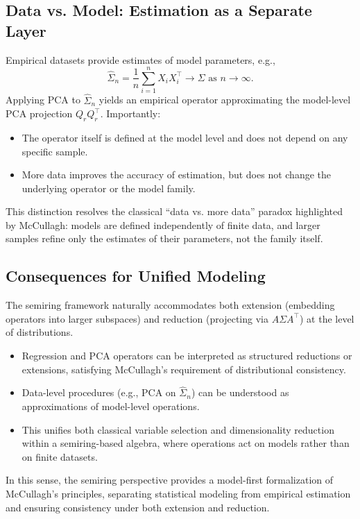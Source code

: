 \subsection{Data vs. Model: Estimation as a Separate Layer}

Empirical datasets provide estimates of model parameters, e.g.,
\[
\hat\Sigma_n = \frac{1}{n} \sum_{i=1}^n X_i X_i^\top \to \Sigma \text{ as } n \to \infty.
\]
Applying PCA to $\hat\Sigma_n$ yields an empirical operator approximating the model-level PCA projection $Q_r Q_r^\top$. Importantly:

\begin{itemize}
\item The operator itself is defined at the model level and does not depend on any specific sample.
\item More data improves the accuracy of estimation, but does not change the underlying operator or the model family.
\end{itemize}

This distinction resolves the classical “data vs. more data” paradox highlighted by McCullagh: models are defined independently of finite data, and larger samples refine only the estimates of their parameters, not the family itself.

\subsection{Consequences for Unified Modeling}

The semiring framework naturally accommodates both extension (embedding operators into larger subspaces) and reduction (projecting via $A \Sigma A^\top$) at the level of distributions.

\begin{itemize}
\item Regression and PCA operators can be interpreted as structured reductions or extensions, satisfying McCullagh’s requirement of distributional consistency.
\item Data-level procedures (e.g., PCA on $\hat\Sigma_n$) can be understood as approximations of model-level operations.
\item This unifies both classical variable selection and dimensionality reduction within a semiring-based algebra, where operations act on models rather than on finite datasets.
\end{itemize}

In this sense, the semiring perspective provides a model-first formalization of McCullagh’s principles, separating statistical modeling from empirical estimation and ensuring consistency under both extension and reduction.